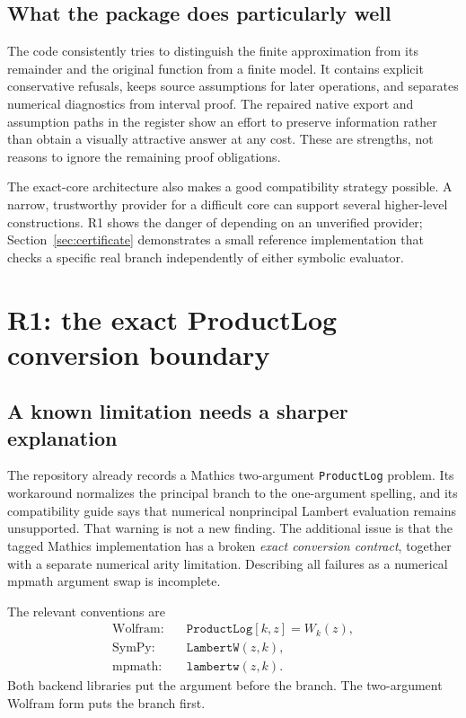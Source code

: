 \documentclass[11pt,a4paper]{article}
\newcommand{\code}[1]{\texttt{#1}}
\begin{document}
\subsection{What the package does particularly well}
The code consistently tries to distinguish the finite approximation from its remainder and the original function from a finite model. It contains explicit conservative refusals, keeps source assumptions for later operations, and separates numerical diagnostics from interval proof. The repaired native export and assumption paths in the register show an effort to preserve information rather than obtain a visually attractive answer at any cost. These are strengths, not reasons to ignore the remaining proof obligations.\cite{register,coreentry}

The exact-core architecture also makes a good compatibility strategy possible. A narrow, trustworthy provider for a difficult core can support several higher-level constructions. R1 shows the danger of depending on an unverified provider; Section~\ref{sec:certificate} demonstrates a small reference implementation that checks a specific real branch independently of either symbolic evaluator.

\section{R1: the exact ProductLog conversion boundary}
\label{sec:productlog}
\subsection{A known limitation needs a sharper explanation}
The repository already records a Mathics two-argument \code{ProductLog} problem. Its workaround normalizes the principal branch to the one-argument spelling, and its compatibility guide says that numerical nonprincipal Lambert evaluation remains unsupported. That warning is not a new finding. The additional issue is that the tagged Mathics implementation has a broken \emph{exact conversion contract}, together with a separate numerical arity limitation. Describing all failures as a numerical mpmath argument swap is incomplete.\cite{mathicsguide,corefunctions,up-productlog,up-base}

The relevant conventions are
\begin{align}
 \text{Wolfram:}\quad &\code{ProductLog}[k,z]=W_k(z),\\
 \text{SymPy:}\quad &\code{LambertW}(z,k),\\
 \text{mpmath:}\quad &\code{lambertw}(z,k).
\end{align}
Both backend libraries put the argument before the branch. The two-argument Wolfram form puts the branch first.\cite{sympy,mpmath}
\end{document}
